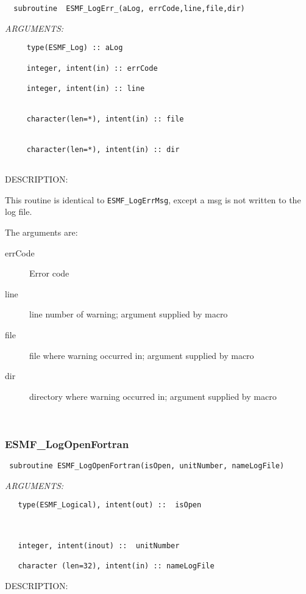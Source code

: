  
\begin{verbatim}  subroutine  ESMF_LogErr_(aLog, errCode,line,file,dir)
 \end{verbatim}{\em ARGUMENTS:}
\begin{verbatim}     type(ESMF_Log) :: aLog
 
     integer, intent(in) :: errCode     
 
     integer, intent(in) :: line           
                                         
 
     character(len=*), intent(in) :: file 
                                           
 
     character(len=*), intent(in) :: dir    
                                         
 \end{verbatim}
{\sf DESCRIPTION:\\ }


     This routine is identical to {\tt ESMF\_LogErrMsg}, except a msg is
     not written to the log file.
  
     The arguments are:
     \begin{description}
  
     \item[errCode]
     Error code   
  
     \item[line]
     line number of warning; argument supplied by macro
  
     \item[file]
     file where warning occurred in; argument supplied by macro
  
     \item[dir]
     directory where warning occurred in; argument supplied by macro
                                                                     
     \end{description}  
 
\mbox{}\hrulefill\ 
 
\subsubsection [ESMF\_LogOpenFortran] {ESMF\_LogOpenFortran}


  
\begin{verbatim} subroutine ESMF_LogOpenFortran(isOpen, unitNumber, nameLogFile)\end{verbatim}{\em ARGUMENTS:}
\begin{verbatim}   type(ESMF_Logical), intent(out) ::  isOpen     
 		                           
 			                   
 
   integer, intent(inout) ::  unitNumber 
 
   character (len=32), intent(in) :: nameLogFile
      \end{verbatim}
{\sf DESCRIPTION:\\ }


